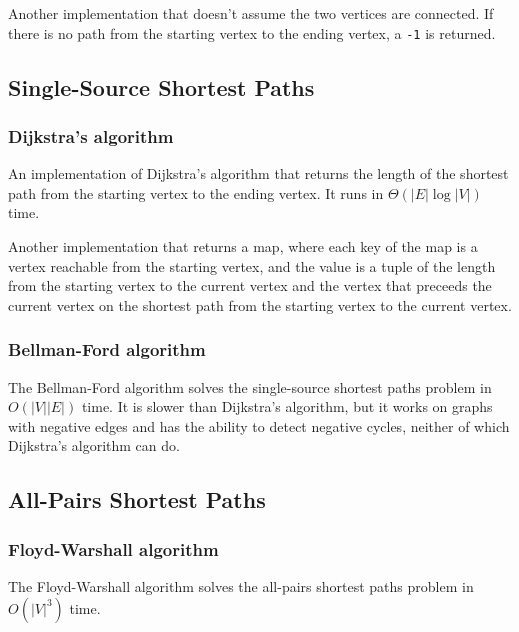 \documentclass[11pt,a4paper,titlepage]{article}
\begin{document}
			Another implementation that doesn't assume the two vertices are connected. If there is no path from the starting vertex to the ending vertex, a \lstinline$-1$ is returned.
			


		\subsection{Single-Source Shortest Paths}
			\subsubsection{Dijkstra's algorithm}
				An implementation of Dijkstra's algorithm that returns the length of the shortest path from the starting vertex to the ending vertex. It runs in $\Theta(|E|\log{|V|})$ time.
				

				Another implementation that returns a map, where each key of the map is a vertex reachable from the starting vertex, and the value is a tuple of the length from the starting vertex to the current vertex and the vertex that preceeds the current vertex on the shortest path from the starting vertex to the current vertex.
				
			\subsubsection{Bellman-Ford algorithm}
				The Bellman-Ford algorithm solves the single-source shortest paths problem in $O(|V||E|)$ time. It is slower than Dijkstra's algorithm, but it works on graphs with negative edges and has the ability to detect negative cycles, neither of which Dijkstra's algorithm can do.
				
		\subsection{All-Pairs Shortest Paths}
			\subsubsection{Floyd-Warshall algorithm}
				The Floyd-Warshall algorithm solves the all-pairs shortest paths problem in $O(|V|^3)$ time.
				
\end{document}
